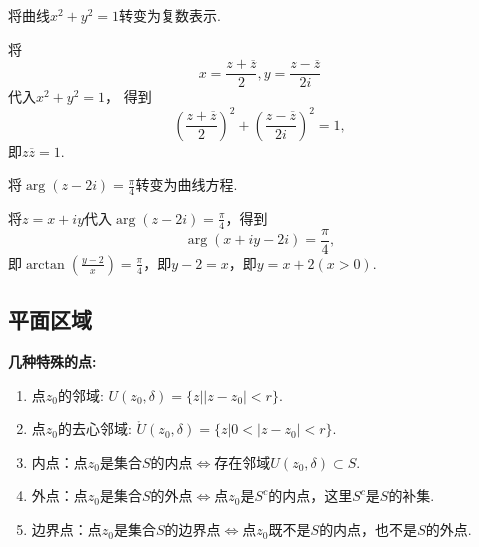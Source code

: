 \documentclass[openany,oneside]{ctexbook}
\begin{document}
\begin{example}
    将曲线$x^2 + y^2 = 1$转变为复数表示.
\end{example}
\begin{solution}
    将$$x = \frac{z + \overline{z}}{2}, y = \frac{z - \overline{z}}{2i}$$代入$x^2 + y^2 = 1$，
    得到$$\left(\frac{z + \overline{z}}{2}\right)^2 + \left(\frac{z - \overline{z}}{2i}\right)^2 = 1,$$
    即$z\overline{z} = 1$.
\end{solution}

\begin{example}
    将$\arg{(z - 2i)} = \frac{\pi}{4}$转变为曲线方程.
\end{example}
\begin{solution}
    将$z = x + iy$代入$\arg{(z - 2i)} = \frac{\pi}{4}$，得到
    $$\arg{(x + iy - 2i)} = \frac{\pi}{4},$$
    即$\arctan\left(\frac{y - 2}{x}\right) = \frac{\pi}{4}$，即$y - 2 = x$，即$y = x + 2(x > 0)$.
\end{solution}

\par\vspace{8pt}


\subsection{平面区域}

\noindent\textbf{几种特殊的点:}
\begin{enumerate}[label=(\arabic*), itemsep=1pt]
    \item 点$z_0$的邻域: $U(z_0, \delta) = \{z\vert\left| z - z_0\right| < r \}$.
    \item 点$z_0$的去心邻域: $\mathring{U}(z_0, \delta) = \{z\vert 0 < \left|z - z_0\right| < r \}$.
    \item 内点：点$z_0$是集合$S$的内点$\iff$存在邻域$U(z_0, \delta) \subset S$.
    \item 外点：点$z_0$是集合$S$的外点$\iff$点$z_0$是$S^c$的内点，这里$S^c$是$S$的补集.
    \item 边界点：点$z_0$是集合$S$的边界点$\iff$点$z_0$既不是$S$的内点，也不是$S$的外点.
\end{enumerate}
\end{document}
